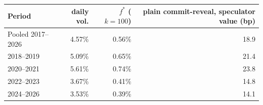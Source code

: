 \begin{tabular}{|l|r|r|r|}
\hline
\rowcolor{gray!15}Period & daily vol. & $f^*$ ($k{=}100$) & plain commit-reveal, speculator value (bp) \\
\hline
Pooled 2017--2026 & 4.57\% & 0.56\% & 18.9 \\
\hline
2018--2019 & 5.09\% & 0.65\% & 21.4 \\
\hline
2020--2021 & 5.61\% & 0.74\% & 23.8 \\
\hline
2022--2023 & 3.67\% & 0.41\% & 14.8 \\
\hline
2024--2026 & 3.53\% & 0.39\% & 14.1 \\
\hline
\end{tabular}
